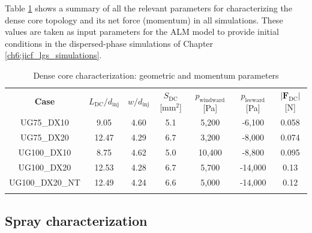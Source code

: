 
Table \ref{tab:dense_core_geometry_pressures_and_force_parameters} shows a summary of all the relevant parameters for characterizing the dense core topology and its net force (momentum) in all simulations. These values are taken as input parameters for the ALM model to provide initial conditions in the dispersed-phase simulations of Chapter \ref{ch6:jicf_lgs_simulations}.


\begin{table}[!h]
\centering
\caption{Dense core characterization: geometric and momentum parameters}
\begin{tabular}{ccccccc}
\thickhline
\textbf{Case} & $L_\mathrm{DC}/d_\mathrm{inj}$ & $w/d_\mathrm{inj}$ & $S_\mathrm{DC}$ [mm$^2$] & $p_\mathrm{windward}$ [Pa] & $p_\mathrm{leeward}$ [Pa]  & $|\boldsymbol{F}_\mathrm{DC}|$ [N] \\
\thickhline 
UG75\_DX10  & 9.05 & 4.60 & 5.1 & 5,200 & -6,100 & 0.058  \\
UG75\_DX20  & 12.47 & 4.29 & 6.7 & 3,200 & -8,000 &  0.074 \\
UG100\_DX10 & 8.75 & 4.62 & 5.0 & 10,400 & -8,800 & 0.095 \\
UG100\_DX20 & 12.53 & 4.28 & 6.7 & 5,700 & -14,000 & 0.13 \\
UG100\_DX20\_NT & 12.49 & 4.24 & 6.6 & 5,000 & -14,000 & 0.12 \\
\thickhline
\end{tabular}
\label{tab:dense_core_geometry_pressures_and_force_parameters}
\end{table}





\subsection{Spray characterization}
\label{subsec:ch5_sec_spray_characterization}

